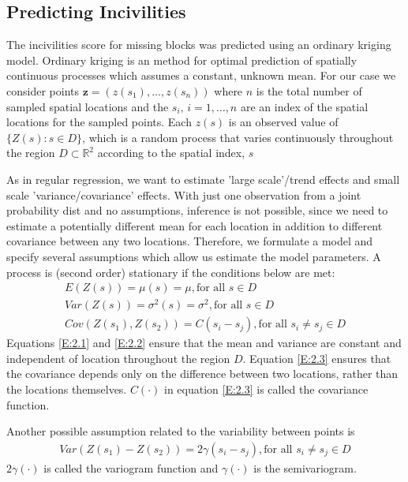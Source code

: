 \subsection*{Predicting Incivilities}

The incivilities score for missing blocks was predicted using an ordinary kriging model.  Ordinary kriging is an method for optimal prediction of spatially continuous processes which assumes a constant, unknown mean.  For our case we consider points $\mathbf{z}=(z(s_{1}), \ldots,z(s_{n}))$ where $n$ is the total number of sampled spatial locations and the $s_{i},\, i=1,\ldots,n$ are an index of the spatial locations for the sampled points. Each $z(s)$ is an observed value of $\{Z(s):s\in D\}$, which is a random process that varies continuously throughout the region $D \subset \mathbb{R}^{2}$ according to the spatial index, $s$

As in regular regression, we want to estimate 'large scale'/trend effects and small scale 'variance/covariance' effects.  With just one observation from a joint probability dist and no assumptions, inference is not possible, since we need to estimate a potentially different mean for each location in addition to different covariance between any two locations. Therefore, we formulate a model and specify several assumptions which allow us estimate the model parameters. A process is (second order) stationary if the conditions below are met:
\begin{gather}
E(Z(s))=\mu(s)=\mu,\text{for all }s \in D \label{E:2.1}\\
Var(Z(s))=\sigma^{2}(s)=\sigma^{2},\text{for all }s \in D \label{E:2.2}\\
Cov(Z(s_{1}),Z(s_{2}))=C(s_{i}-s_{j}),\text{for all }s_{i}\ne s_{j} \in D \label{E:2.3}
\end{gather}
Equations \ref{E:2.1} and \ref{E:2.2} ensure that the mean and variance are constant and independent of location throughout the region $D$. Equation \ref{E:2.3} ensures that the covariance depends only on the difference between two locations, rather than the locations themselves. $C(\cdot)$ in equation \ref{E:2.3} is called the covariance function.

Another possible assumption related to the variability between points is
\begin{gather}
Var(Z(s_{1})-Z(s_{2}))=2\gamma(s_{i}-s_{j}),\text{for all }s_{i}\ne s_{j} \in D\label{E:2.4}
\end{gather}
$2\gamma(\cdot)$ is called the variogram function and $\gamma(\cdot)$ is the semivariogram.

